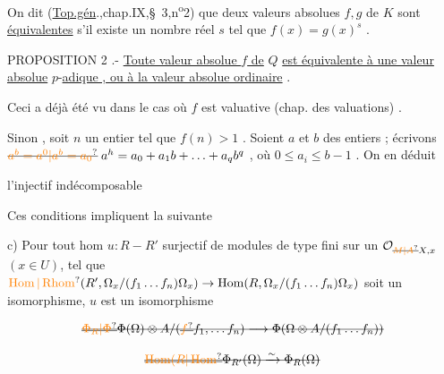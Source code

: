 On dit (\uline{Top.gén}.,chap.IX,\S~3,n\textsuperscript{o}2) que deux valeurs absolues $f,g$ de $K$ sont \uline{équivalentes} s'il existe un nombre réel $s$ tel que $f(x)=g(x)^s$ .

PROPOSITION 2 .- \uline{Toute valeur absolue $f$ de} $Q$ \uline{est équivalente à une valeur absolue} $p$-\uline{adique , ou à la valeur absolue ordinaire} .

Ceci a déjà été vu dans le cas où $f$ est valuative (chap. des valuations) .

Sinon , soit $n$ un entier tel que $f(n)>1$ . Soient $a$ et $b$ des entiers  ; écrivons $\deleted{\unsure{a^{b}=a^{0}|a^{b}=a_{0}}}\;a^{h}=a_{0}+a_{1}b+\ldots+a_{q}b^{q}$ , où $0\leqslant a_{i}\leqslant b-1$ . On en déduit

l'injectif indécomposable

Ces conditions impliquent la suivante

c) Pour tout hom $u\colon R\mathbin{-}R'$ surjectif de modules de type fini sur un $\mathcal O_{\deleted{\unsure{M|A}}X,x}$ $(x\in U)$, tel que $\unsure{\operatorname{Hom}|\operatorname{Rhom}}(R',\Omega_x/(f_1\ldots f_n)\Omega_x)\to\operatorname{Hom}(R,\Omega_x/(f_1\ldots f_n)\Omega_x)$ soit un isomorphisme,  $u$ est  un isomorphisme



\[
\deleted{\deleted{\unsure{\Phi_R|\Phi}}\Phi(\Omega)\otimes A/(\deleted{\unsure{f}}f_1,\ldots f_n)\longrightarrow\Phi(\Omega\otimes A/(f_1\ldots f_n))}
\]

\[
\deleted{\deleted{\unsure{\operatorname{Hom}(R|\operatorname{Hom}}}\Phi_{R'}(\Omega)\xrightarrow{\sim}\Phi_R(\Omega)}
\]


